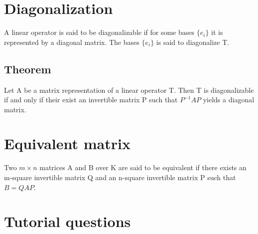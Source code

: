 \documentclass{book}
\begin{document}
\section{Diagonalization}

A linear operator is said to be diagonalizable if for some bases \(\{e_i\}\) it is represented by a diagonal matrix. The bases \(\{e_i\}\) is said to diagonalize T.

\subsection{Theorem}

Let A be a matrix representation of a linear operator T. Then T is diagonalizable if and only if their exist an invertible matrix P such that \(P^{-1} A P\) yields a diagonal matrix.

\section{Equivalent matrix}

Two \(m \times n\) matrices A and B over K are said to be equivalent if there exists an m-square invertible matrix Q and an n-square invertible matrix P such that \(B = QAP\).

\section{Tutorial questions}
\end{document}

